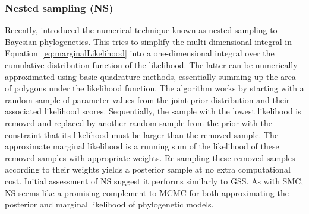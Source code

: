 
\subsubsection{Nested sampling (NS)}
Recently, \citet{Maturana2017} introduced the numerical technique known as
nested sampling  to Bayesian phylogenetics.
This tries to simplify the multi-dimensional integral in
Equation~\ref{eq:marginalLikelihood}
into a one-dimensional integral over the cumulative distribution function
of the likelihood.
The latter can be numerically approximated using basic quadrature methods,
essentially summing up the area of polygons under the likelihood function.
The algorithm works by starting with a random sample of parameter values
from the joint prior distribution and their associated likelihood
scores.
Sequentially, the sample with the lowest likelihood is removed and replaced by
another random sample from the prior with the constraint that its likelihood
must be larger than the removed sample.
The approximate marginal likelihood is a running sum of the likelihood of these
removed samples with appropriate weights.
Re-sampling these removed samples according to their weights yields a posterior
sample at no extra computational cost.
Initial assessment of NS suggest it performs similarly to GSS.
As with SMC, NS seems like a promising complement to MCMC for both
approximating the posterior and marginal likelihood of phylogenetic models.


